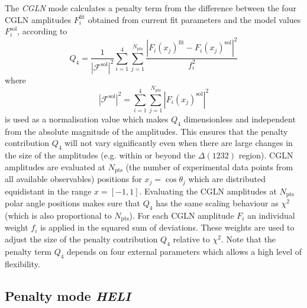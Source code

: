\documentclass[a4paper,10pt]{article}
\begin{document}
The \textit{CGLN} mode calculates a penalty term from the difference between the four
CGLN amplitudes $F_i^\mathrm{fit}$ obtained from current fit parameters and the model values $F_i^\mathrm{sol}$,
according to
\begin{displaymath}
 Q_4 =\frac{1}{|\mathcal{F}^\mathrm{sol}|^2}
\sum_{i=1}^4
\sum_{j=1}^{N_\mathrm{pts}}
\frac{|F_i(x_j)^\mathrm{fit} - F_i(x_j)^\mathrm{sol}|^2}{f_i^2}
\end{displaymath}
where
\begin{displaymath}
 |\mathcal{F}^\mathrm{sol}|^2 = \sum_{i=1}^4\sum_{j=1}^{N_\mathrm{pts}} |F_i(x_j)^\mathrm{sol}|^2
\end{displaymath}
is used as a normalisation value which makes $Q_4$ dimensionless and independent from the absolute magnitude of the amplitudes.
This ensures that the penalty contribution $Q_4$ will not vary significantly even when there are large changes in the size of
the amplitudes (e.g. within or beyond the $\Delta(1232)$ region).
CGLN amplitudes are evaluated at $N_\mathrm{pts}$ (the number of experimental data points from all available observables)
positions for $x_j = \cos\theta_j$ which are distributed equidistant in the range $x = [-1,1]$.
Evaluating the CGLN amplitudes at $N_\mathrm{pts}$ polar angle positions makes sure that $Q_4$ has the same scaling behaviour
as $\chi^2$ (which is also proportional to $N_\mathrm{pts}$).
For each CGLN amplitude $F_i$ an individual weight $f_i$ is applied in the squared sum of deviations. These weights are used
to adjust the size of the penalty contribution $Q_4$ relative to $\chi^2$. Note that the penalty term $Q_4$ depends on
four external parameters which allows a high level of flexibility.

\subsection{Penalty mode \textit{HELI}}
\end{document}
